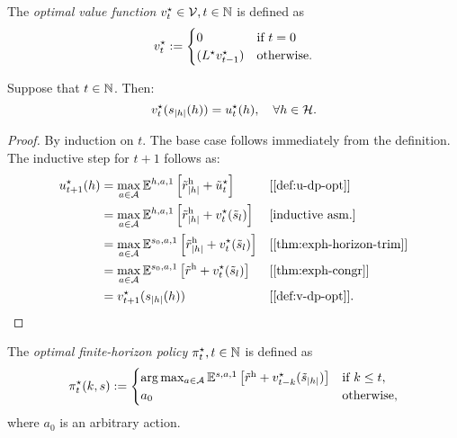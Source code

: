 \begin{definition} \label{def:v-dp-opt}
The \emph{optimal value function} $v^{\star}_t\in \mathcal{V}, t\in \mathbb{N}$ is defined as
\[
v^{\star}_t := 
\begin{cases}
    0 &\text{if } t = 0 \\
    (L^{\star}  v^{\star} _{t-1}) &\text{otherwise}.
\end{cases}
\]
\leanok
\end{definition}

\begin{theorem}
Suppose that $t\in \mathbb{N} $. Then:
\[
v^{\star}_t(s_{|h|}(h)) = u^{\star}_t(h), \quad \forall h\in \mathcal{H}.
\]
\end{theorem}
\begin{proof}
By induction on $t$. The base case follows immediately from the definition. The inductive step for $t+1$ follows as:
\begin{align*}
  u\opt_{t+1}(h)
  &= \max_{a\in \mathcal{A}} \E^{h, a, 1} \left[ \rew_{|h|} + \tilde{u}\opt_t  \right]
  && \why{\cref{def:u-dp-opt}} \\
  &= \max_{a\in \mathcal{A}} \E^{h, a, 1} \left[ \rew_{|h|} + v\opt_t(\tilde{s}_l) \right] 
    && \why{inductive asm.}  \\
  &= \max_{a\in \mathcal{A}} \E^{s_0, a, 1} \left[ \rew_{|h|} + v\opt_t(\tilde{s}_l) \right]
    && \why{\cref{thm:exph-horizon-trim}} \\
  &= \max_{a\in \mathcal{A}} \E^{s_0, a, 1} \left[ \rew + v\opt_t(\tilde{s}_l) \right]
  && \why{\cref{thm:exph-congr}} \\
  &= v\opt_{t+1}(s_{|h|}(h)) && \why{\cref{def:v-dp-opt}}.
\end{align*}
\end{proof}


\begin{definition} \label{def:pi-opt}
  The \emph{optimal finite-horizon policy} $\pi^{\star}_t, t\in \mathbb{N}$ is defined as
  \[
    \pi^{\star}_t(k,s) :=
    \begin{cases}
      \arg\max_{a\in \mathcal{A}}  \mathbb{E}^{s, a, 1} \left[ \tilde{r}^{\mathrm{h}} + v_{t-k}^{\star} (\tilde{s}_{|h|}) \right]
      &\text{if } k \le t, \\
      a_0 &\text{otherwise},
    \end{cases}
  \]
  where $a_0$ is an arbitrary action.
  \leanok
\end{definition}

